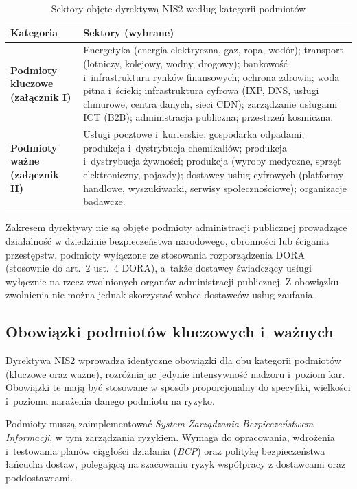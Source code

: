 \begin{table}[H]
\centering
\caption{Sektory objęte dyrektywą NIS2 według kategorii podmiotów}
\label{tab:nis2_sektory}
\begin{tabular}{>{\bfseries}p{4.5cm} p{8.5cm}}
\hline
Kategoria & Sektory (wybrane) \\
\hline
Podmioty kluczowe (załącznik I)
 & Energetyka (energia elektryczna, gaz, ropa, wodór); transport (lotniczy,
    kolejowy, wodny, drogowy); bankowość i~infrastruktura rynków finansowych;
    ochrona zdrowia; woda pitna i~ścieki; infrastruktura cyfrowa (IXP, DNS,
    usługi chmurowe, centra danych, sieci CDN); zarządzanie usługami ICT (B2B);
    administracja publiczna; przestrzeń kosmiczna. \\[4pt]
Podmioty ważne (załącznik II)
 & Usługi pocztowe i~kurierskie; gospodarka odpadami; produkcja
    i~dystrybucja chemikaliów; produkcja i~dystrybucja żywności; produkcja
    (wyroby medyczne, sprzęt elektroniczny, pojazdy); dostawcy usług cyfrowych
    (platformy handlowe, wyszukiwarki, serwisy społecznościowe); organizacje
    badawcze. \\
\hline
\end{tabular}
\end{table}

Zakresem dyrektywy nie są objęte podmioty administracji publicznej prowadzące działalność w dziedzinie bezpieczeństwa narodowego, obronności lub ścigania
przestępstw, podmioty wyłączone ze stosowania rozporządzenia DORA~\autocite{dora2022} (stosownie do art.~2 ust.~4 DORA), a~także dostawcy świadczący usługi
wyłącznie na rzecz zwolnionych organów administracji publicznej. Z obowiązku zwolnienia nie można jednak skorzystać wobec dostawców usług zaufania.

\subsection*{Obowiązki podmiotów kluczowych i~ważnych}

Dyrektywa NIS2 wprowadza identyczne obowiązki dla obu kategorii podmiotów (kluczowe oraz ważne), rozróżniając jedynie intensywność nadzoru i~poziom kar. Obowiązki te mają być stosowane w sposób proporcjonalny do specyfiki, wielkości i~poziomu narażenia danego podmiotu na ryzyko.

Podmioty muszą zaimplementować \textit{System Zarządzania Bezpieczeństwem Informacji}, w tym zarządzania ryzykiem. Wymaga do opracowania, wdrożenia i~testowania planów ciągłości działania (\textit{BCP}) oraz politykę bezpieczeństwa łańcucha dostaw, polegającą na szacowaniu ryzyk współpracy z dostawcami oraz poddostawcami.

